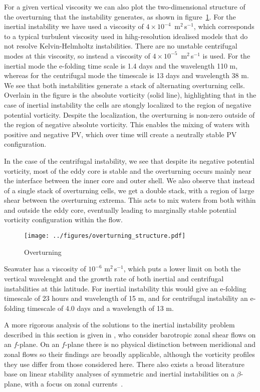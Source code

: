 For a given vertical viscosity we can also plot the two-dimensional structure of the overturning that the instability generates, as shown in figure~\ref{fig:2DStructure}. For the inertial instability we have used a viscosity of $4 \times 10 ^{-4}$~m$^2$\,s$^{-1}$, which corresponds to a typical turbulent viscosity used in hihg-resolution idealised models that do not resolve Kelvin-Helmholtz instabilities. There are no unstable centrifugal modes at this viscosity, so instead a viscosity of $4 \times 10 ^{-5}$~m$^2$\,s$^{-1}$ is used. For the inertial mode the e-folding time scale is 1.4 days and the wavelength 110 m, whereas for the centrifugal mode the timescale is 13 days and wavelength 38 m. We see that both instabilities generate a stack of alternating overturning cells. Overlain in the figure is the absolute vorticity (solid line), highlighting that in the case of inertial instability the cells are stongly localized to the region of negative potential vorticity. Despite the localization, the overturning is non-zero outside of the region of negative absolute vorticity. This enables the mixing of waters with positive and negative PV, which over time will create a neutrally stable PV configuration.

In the case of the centrifugal instability, we see that despite its negative potential vorticity, most of the eddy core is stable and the overturning occurs mainly near the interface between the inner core and outer shell. We also observe that instead of a single stack of overturning cells, we get a double stack, with a region of large shear between the overturning extrema. This acts to mix waters from both within and outside the eddy core, eventually leading to marginally stable potential vorticity configuration within the flow.

\begin{figure}
    \centering
    \texttt{[image: ../figures/overturning\_structure.pdf]}
    \caption{Overturning}
    \label{fig:2DStructure}
\end{figure}

Seawater has a viscosity of $10^{-6}$ m$^{2}$\,s$^{-1}$, which puts a lower limit on both the vertical wavelenght and the growth rate of both inertial and centrifugal instabilities at this latitude. For inertial instability this would give an e-folding timescale of 23 hours and wavelength of 15 m, and for centrifugal instability an e-folding timescale of 4.0 days and a wavelength of 13 m. 

A more rigorous analysis of the solutions to the inertial instability problem described in this section is given in \citet{Plougonven2009}, who consider barotropic zonal shear flows on an $f$-plane. On an $f$-plane there is no physical distinction between meridional and zonal flows so their findings are broadly applicable, although the vorticity profiles they use differ from those considered here. There also exists a broad literature base on linear stability analyses of symmetric and inertial instabilities on a $\beta$-plane, with a focus on zonal currents~\citep[e.g.][]{Kloosterziel2017, Ribstein2014,Griffiths2003, Hua1997}.


